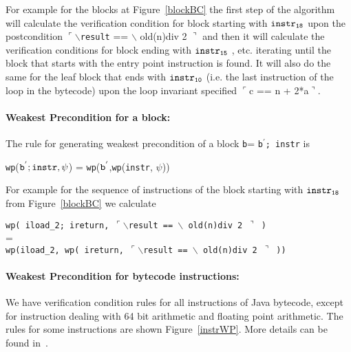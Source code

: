 For example for the blocks at Figure~\ref{blockBC} the first step of the algorithm will calculate the verification condition for block starting with $ \tt{instr_{18}}$ upon the postcondition  $\ulcorner \backslash$\texttt{result} == $\backslash$ old(n)div 2 $\urcorner$ and then it will calculate the verification conditions for block ending with $\tt{instr_{15}}$ , etc. iterating until the block that starts with the entry point instruction is found.
It will also do the same for the leaf block that ends with $\tt{instr_{10}}$ (i.e. the last instruction of the loop in the bytecode) upon the loop invariant specified $\ulcorner$c == n + 2*a$\urcorner$.

\paragraph{Weakest Precondition for a block: }\label{block}
The rule for generating weakest precondition of a block \texttt{b}= \texttt{b$^{'}$; instr} is
\begin{center}
\texttt{wp}($\tt{b^{'}; instr}, \psi$) = \texttt{wp}($\tt{b^{'}}$,\texttt{wp}(\texttt{instr}, $\psi$))
\end{center}

For example for the sequence of instructions of the block starting with $\tt{instr_{18}}$ from Figure~\ref{blockBC} we calculate
\begin{center}
\texttt{wp( iload\_2; ireturn,  $\ulcorner \backslash$\texttt{result} == $\backslash$ old(n)div 2 $\urcorner$ )}
\\
=
\\
\texttt{wp(iload\_2, wp( ireturn, $\ulcorner \backslash$\texttt{result} == $\backslash$ old(n)div 2 $\urcorner$ ))} \end{center}

\paragraph{Weakest Precondition for bytecode instructions: }
We have verification condition rules for all instructions of Java bytecode, except for instruction dealing with 64 bit arithmetic and floating point arithmetic.
The rules for some instructions are shown Figure~\ref{instrWP}. More details can be found in~\cite{WPBC}.

